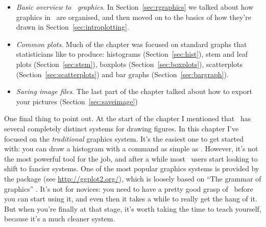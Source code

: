 \begin{itemize}
\item {\it Basic overview to \R\ graphics}. In Section~\ref{sec:rgraphics} we talked about how graphics in \R\ are organised, and then moved on to the basics of how they're drawn in Section~\ref{sec:introplotting}.
\item {\it Common plots}. Much of the chapter was focused on standard graphs that statisticians like to produce: histograms (Section~\ref{sec:hist}), stem and leaf plots (Section~\ref{sec:stem}), boxplots (Section~\ref{sec:boxplots}), scatterplots (Section~\ref{sec:scatterplots}) and bar graphs (Section~\ref{sec:bargraph}).
\item {\it Saving image files}. The last part of the chapter talked about how to export your pictures (Section~\ref{sec:saveimage})
\end{itemize} 

\noindent
One final thing to point out. At the start of the chapter I mentioned that \R\ has several completely distinct systems for drawing figures. In this chapter I've focused on the {\it traditional} graphics system. It's the easiest one to get started with: you can draw a histogram with a command as simple as . However, it's not the most powerful tool for the job, and after a while most \R\ users start looking to shift to fancier systems. One of the most popular graphics systems is provided by the  package (see \url{http://ggplot2.org/}), which is loosely based on ``The grammar of graphics'' \cite{Wilkinson2006}. It's not for novices: you need to have a pretty good grasp of \R\ before you can start using it, and even then it takes a while to really get the hang of it. But when you're finally at that stage, it's worth taking the time to teach yourself, because it's a much cleaner system.



